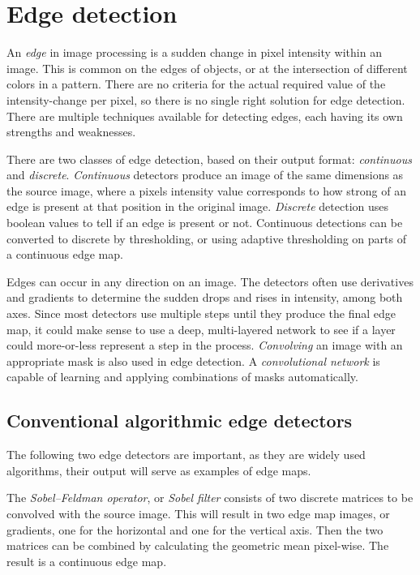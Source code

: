 \documentclass[12pt]{report}
\begin{document}
\section{Edge detection}
An \textit{edge} in image processing is a sudden change in pixel intensity within an image. This is common on the edges of objects, or at the intersection of different colors in a pattern. There are no criteria for the actual required value of the intensity-change per pixel, so there is no single right solution for edge detection. There are multiple techniques available for detecting edges, each having its own strengths and weaknesses.

There are two classes of edge detection, based on their output format: \textit{continuous} and \textit{discrete}. \textit{Continuous} detectors produce an image of the same dimensions as the source image, where a pixels intensity value corresponds to how strong of an edge is present at that position in the original image. \textit{Discrete} detection uses boolean values to tell if an edge is present or not. Continuous detections can be converted to discrete by thresholding, or using adaptive thresholding on parts of a continuous edge map.

Edges can occur in any direction on an image. The detectors often use derivatives and gradients to determine the sudden drops and rises in intensity, among both axes. Since most detectors use multiple steps until they produce the final edge map, it could make sense to use a deep, multi-layered network to see if a layer could more-or-less represent a step in the process. \textit{Convolving} an image with an appropriate mask is also used in edge detection. A \textit{convolutional network} is capable of learning and applying combinations of masks automatically.
\subsection{Conventional algorithmic edge detectors}
The following two edge detectors are important, as they are widely used algorithms, their output will serve as examples of edge maps.

The \textit{Sobel–Feldman operator}, or \textit{Sobel filter} \cite{sobel} consists of two discrete matrices to be convolved with the source image. This will result in two edge map images, or gradients, one for the horizontal and one for the vertical axis. Then the two matrices can be combined by calculating the geometric mean pixel-wise. The result is a continuous edge map.
\end{document}
